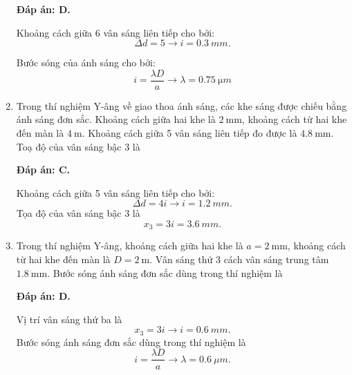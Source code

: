 \begin{enumerate}[label=\bfseries Câu \arabic*:]
	\loigiai
	{		\textbf{Đáp án: D.}
	
Khoảng cách giữa 6 vân sáng liên tiếp cho bởi:
$$
	\Delta d = 5 \rightarrow i = \SI{0,3}{mm}.
$$
		
Bước sóng của ánh sáng cho bởi:
$$
	i = \dfrac{\lambda D}{a} \rightarrow \lambda = \SI{0,75}{\micro m}
$$
		
	}
	
\item {} 
	
	\cauhoi
	{Trong thí nghiệm Y-âng về giao thoa ánh sáng, các khe sáng được chiếu bằng ánh sáng đơn sắc. Khoảng cách giữa hai khe là $\SI{2}{\milli \meter}$, khoảng cách từ hai khe đến màn là $\SI{4}{\meter}$. Khoảng cách giữa 5 vân sáng liên tiếp đo được là $\SI{4.8}{\milli \meter}$. Toạ độ của vân sáng bậc 3 là
	}
	
	\loigiai
	{		\textbf{Đáp án: C.}
		
Khoảng cách giữa 5 vân sáng liên tiếp cho bởi:
$$
	\Delta d = 4i \rightarrow i = \SI{1,2}{mm}.
$$
Tọa độ của vân sáng bậc 3 là
$$
	x_{3} = 3i = \SI{3,6}{mm}.
$$
		
	}
	
\item {} 
	
	\cauhoi
	{Trong thí nghiệm Y-âng, khoảng cách giữa hai khe là $a=\SI{2}{\milli \meter}$, khoảng cách từ hai khe đến màn là $D=\SI{2}{\meter}$. Vân sáng thứ 3 cách vân sáng trung tâm $\SI{1.8}{\milli \meter}$. Bước sóng ánh sáng đơn sắc dùng trong thí nghiệm là
	}
	
	\loigiai
	{		\textbf{Đáp án: D.}
		
Vị trí vân sáng thứ ba là
$$
	x_{3} = 3i \rightarrow i = \SI{0,6}{mm}.
$$
Bước sóng ánh sáng đơn sắc dùng trong thí nghiệm là
$$
	i = \dfrac{\lambda D}{a} \rightarrow \lambda = \SI{0,6}{\mu m}.
$$
		
}
\end{enumerate}
